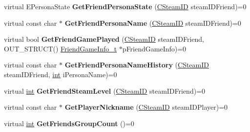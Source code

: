 \begin{DoxyCompactItemize}
\item 
\hypertarget{classISteamFriends_a5b36ac050fd54ca8c9a2fc7c3f2d6e33}{}virtual E\+Persona\+State {\bfseries Get\+Friend\+Persona\+State} (\hyperlink{classCSteamID}{C\+Steam\+I\+D} steam\+I\+D\+Friend)=0\label{classISteamFriends_a5b36ac050fd54ca8c9a2fc7c3f2d6e33}

\item 
\hypertarget{classISteamFriends_a2bfbd1689cf78511bda6ee3b753ec773}{}virtual const char $\ast$ {\bfseries Get\+Friend\+Persona\+Name} (\hyperlink{classCSteamID}{C\+Steam\+I\+D} steam\+I\+D\+Friend)=0\label{classISteamFriends_a2bfbd1689cf78511bda6ee3b753ec773}

\item 
\hypertarget{classISteamFriends_a7a2c2b3994169056d50ef805393648ab}{}virtual bool {\bfseries Get\+Friend\+Game\+Played} (\hyperlink{classCSteamID}{C\+Steam\+I\+D} steam\+I\+D\+Friend, O\+U\+T\+\_\+\+S\+T\+R\+U\+C\+T() \hyperlink{structFriendGameInfo__t}{Friend\+Game\+Info\+\_\+t} $\ast$p\+Friend\+Game\+Info)=0\label{classISteamFriends_a7a2c2b3994169056d50ef805393648ab}

\item 
\hypertarget{classISteamFriends_a57fa398ce9edb552da199821f3598077}{}virtual const char $\ast$ {\bfseries Get\+Friend\+Persona\+Name\+History} (\hyperlink{classCSteamID}{C\+Steam\+I\+D} steam\+I\+D\+Friend, \hyperlink{SDL__thread_8h_a6a64f9be4433e4de6e2f2f548cf3c08e}{int} i\+Persona\+Name)=0\label{classISteamFriends_a57fa398ce9edb552da199821f3598077}

\item 
\hypertarget{classISteamFriends_a922c14f329d09c0f4aa251b5900e475a}{}virtual \hyperlink{SDL__thread_8h_a6a64f9be4433e4de6e2f2f548cf3c08e}{int} {\bfseries Get\+Friend\+Steam\+Level} (\hyperlink{classCSteamID}{C\+Steam\+I\+D} steam\+I\+D\+Friend)=0\label{classISteamFriends_a922c14f329d09c0f4aa251b5900e475a}

\item 
\hypertarget{classISteamFriends_a9ea8988ff44219141dec56deb123d3cd}{}virtual const char $\ast$ {\bfseries Get\+Player\+Nickname} (\hyperlink{classCSteamID}{C\+Steam\+I\+D} steam\+I\+D\+Player)=0\label{classISteamFriends_a9ea8988ff44219141dec56deb123d3cd}

\item 
\hypertarget{classISteamFriends_a6dc3d91e79c8efcc5666640eeaa988d8}{}virtual \hyperlink{SDL__thread_8h_a6a64f9be4433e4de6e2f2f548cf3c08e}{int} {\bfseries Get\+Friends\+Group\+Count} ()=0\label{classISteamFriends_a6dc3d91e79c8efcc5666640eeaa988d8}


\end{DoxyCompactItemize}
